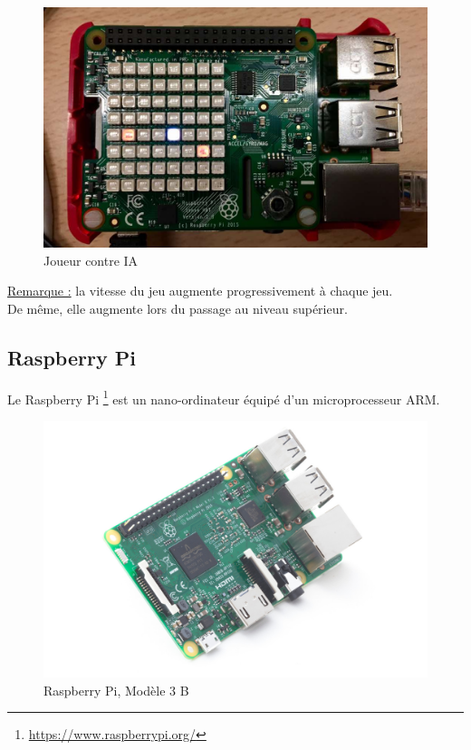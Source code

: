 \begin{figure}[h]
  \centering
  \includegraphics[scale=0.25]
  {textures/images/presentation/game2.jpg}
  \caption{Joueur contre IA}
  \label{fig:joueur-ia}
\end{figure}

\vspace{1cm}

\underline{Remarque :} la vitesse du jeu augmente progressivement à chaque jeu. \\
De même, elle augmente lors du passage au niveau supérieur.

\newpage

\subsection{Raspberry Pi}
\label{sec:raspbeery-pi}

Le Raspberry Pi \footnote{\url{https://www.raspberrypi.org/}} est un
nano-ordinateur équipé d'un microprocesseur ARM.

\begin{figure}[h]
  \centering
  \includegraphics[scale=0.18]
  {textures/images/presentation/raspberry.jpg}
  \caption{Raspberry Pi, Modèle 3 B}
  \label{fig:raspberry-pi}
\end{figure}

